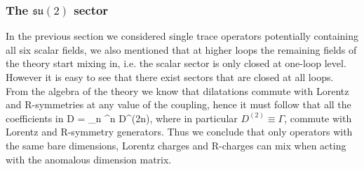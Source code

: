 \subsubsection{The $\mathfrak{su}(2)$ sector}

In the previous section we considered single trace operators potentially containing all six scalar fields, we also mentioned that at higher loops the remaining fields of the theory start mixing in, i.e. the scalar sector is only closed at one-loop level.
However it is easy to see that there exist sectors that are closed at all loops.
From the algebra of the theory we know that dilatations commute with Lorentz and R-symmetries at any value of the coupling, hence it must follow that all the coefficients in
\beq
	D = \sum_n \lambda^n D^{(2n)},
\eeq
where in particular $D^{(2)} \equiv \Gamma$, commute with  Lorentz and R-symmetry generators. 
Thus we conclude that only operators with the same bare dimensions, Lorentz charges and R-charges can mix when acting with the anomalous dimension matrix.

